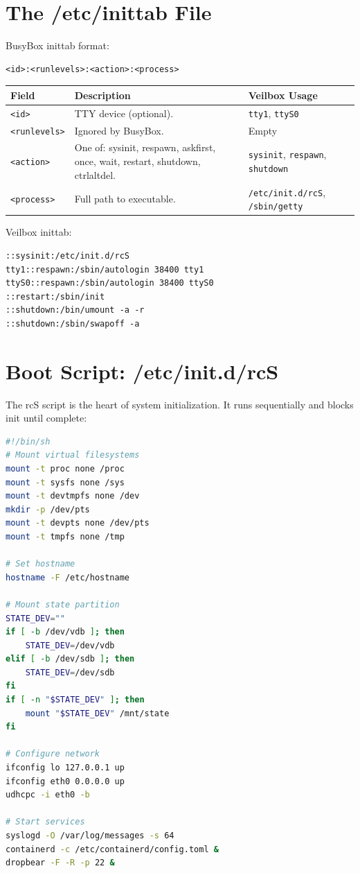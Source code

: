 \section{The /etc/inittab File}

BusyBox inittab format:

\begin{lstlisting}
<id>:<runlevels>:<action>:<process>
\end{lstlisting}

\begin{longtable}{|p{2.5cm}|p{4cm}|p{6cm}|}
\hline
\textbf{Field} & \textbf{Description} & \textbf{Veilbox Usage} \\
\hline
\texttt{<id>} & TTY device (optional). & \texttt{tty1}, \texttt{ttyS0} \\
\texttt{<runlevels>} & Ignored by BusyBox. & Empty \\
\texttt{<action>} & One of: sysinit, respawn, askfirst, once, wait, restart, shutdown, ctrlaltdel. & \texttt{sysinit}, \texttt{respawn}, \texttt{shutdown} \\
\texttt{<process>} & Full path to executable. & \texttt{/etc/init.d/rcS}, \texttt{/sbin/getty} \\
\hline
\end{longtable}

Veilbox inittab:

\begin{lstlisting}
::sysinit:/etc/init.d/rcS
tty1::respawn:/sbin/autologin 38400 tty1
ttyS0::respawn:/sbin/autologin 38400 ttyS0
::restart:/sbin/init
::shutdown:/bin/umount -a -r
::shutdown:/sbin/swapoff -a
\end{lstlisting}

\section{Boot Script: /etc/init.d/rcS}

The rcS script is the heart of system initialization. It runs
sequentially and blocks init until complete:

\begin{lstlisting}[language=bash]
#!/bin/sh
# Mount virtual filesystems
mount -t proc none /proc
mount -t sysfs none /sys
mount -t devtmpfs none /dev
mkdir -p /dev/pts
mount -t devpts none /dev/pts
mount -t tmpfs none /tmp

# Set hostname
hostname -F /etc/hostname

# Mount state partition
STATE_DEV=""
if [ -b /dev/vdb ]; then
    STATE_DEV=/dev/vdb
elif [ -b /dev/sdb ]; then
    STATE_DEV=/dev/sdb
fi
if [ -n "$STATE_DEV" ]; then
    mount "$STATE_DEV" /mnt/state
fi

# Configure network
ifconfig lo 127.0.0.1 up
ifconfig eth0 0.0.0.0 up
udhcpc -i eth0 -b

# Start services
syslogd -O /var/log/messages -s 64
containerd -c /etc/containerd/config.toml &
dropbear -F -R -p 22 &
\end{lstlisting}

